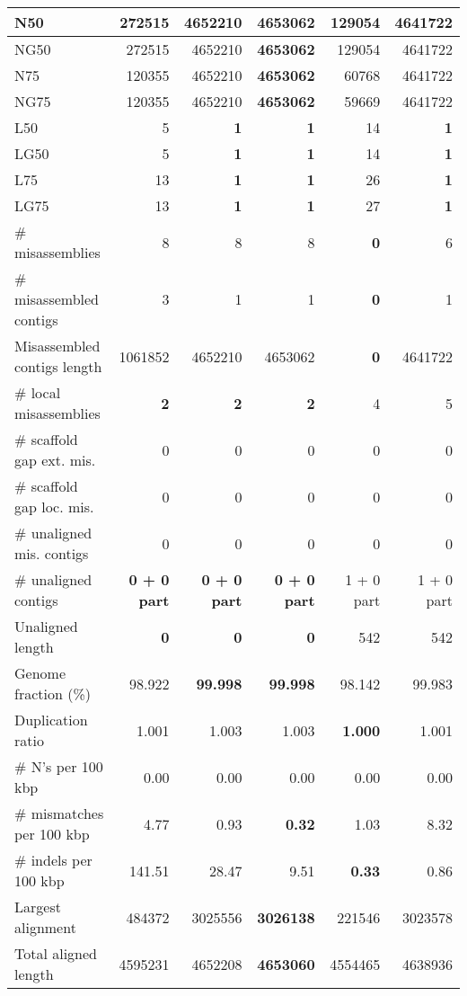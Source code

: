 \documentclass[12pt,a4paper]{article}
\begin{document}
\begin{table}[ht]
\begin{center}
\begin{tabular}{|l*{5}{|r}|}
N50 & 272515 & 4652210 & {\bf 4653062} & 129054 & 4641722 \\ \hline
NG50 & 272515 & 4652210 & {\bf 4653062} & 129054 & 4641722 \\ \hline
N75 & 120355 & 4652210 & {\bf 4653062} & 60768 & 4641722 \\ \hline
NG75 & 120355 & 4652210 & {\bf 4653062} & 59669 & 4641722 \\ \hline
L50 & 5 & {\bf 1} & {\bf 1} & 14 & {\bf 1} \\ \hline
LG50 & 5 & {\bf 1} & {\bf 1} & 14 & {\bf 1} \\ \hline
L75 & 13 & {\bf 1} & {\bf 1} & 26 & {\bf 1} \\ \hline
LG75 & 13 & {\bf 1} & {\bf 1} & 27 & {\bf 1} \\ \hline
\# misassemblies & 8 & 8 & 8 & {\bf 0} & 6 \\ \hline
\# misassembled contigs & 3 & 1 & 1 & {\bf 0} & 1 \\ \hline
Misassembled contigs length & 1061852 & 4652210 & 4653062 & {\bf 0} & 4641722 \\ \hline
\# local misassemblies & {\bf 2} & {\bf 2} & {\bf 2} & 4 & 5 \\ \hline
\# scaffold gap ext. mis. & 0 & 0 & 0 & 0 & 0 \\ \hline
\# scaffold gap loc. mis. & 0 & 0 & 0 & 0 & 0 \\ \hline
\# unaligned mis. contigs & 0 & 0 & 0 & 0 & 0 \\ \hline
\# unaligned contigs & {\bf 0 + 0 part} & {\bf 0 + 0 part} & {\bf 0 + 0 part} & 1 + 0 part & 1 + 0 part \\ \hline
Unaligned length & {\bf 0} & {\bf 0} & {\bf 0} & 542 & 542 \\ \hline
Genome fraction (\%) & 98.922 & {\bf 99.998} & {\bf 99.998} & 98.142 & 99.983 \\ \hline
Duplication ratio & 1.001 & 1.003 & 1.003 & {\bf 1.000} & 1.001 \\ \hline
\# N's per 100 kbp & 0.00 & 0.00 & 0.00 & 0.00 & 0.00 \\ \hline
\# mismatches per 100 kbp & 4.77 & 0.93 & {\bf 0.32} & 1.03 & 8.32 \\ \hline
\# indels per 100 kbp & 141.51 & 28.47 & 9.51 & {\bf 0.33} & 0.86 \\ \hline
Largest alignment & 484372 & 3025556 & {\bf 3026138} & 221546 & 3023578 \\ \hline
Total aligned length & 4595231 & 4652208 & {\bf 4653060} & 4554465 & 4638936 \\ \hline

\end{tabular}
\end{center}
\end{table}
\end{document}

